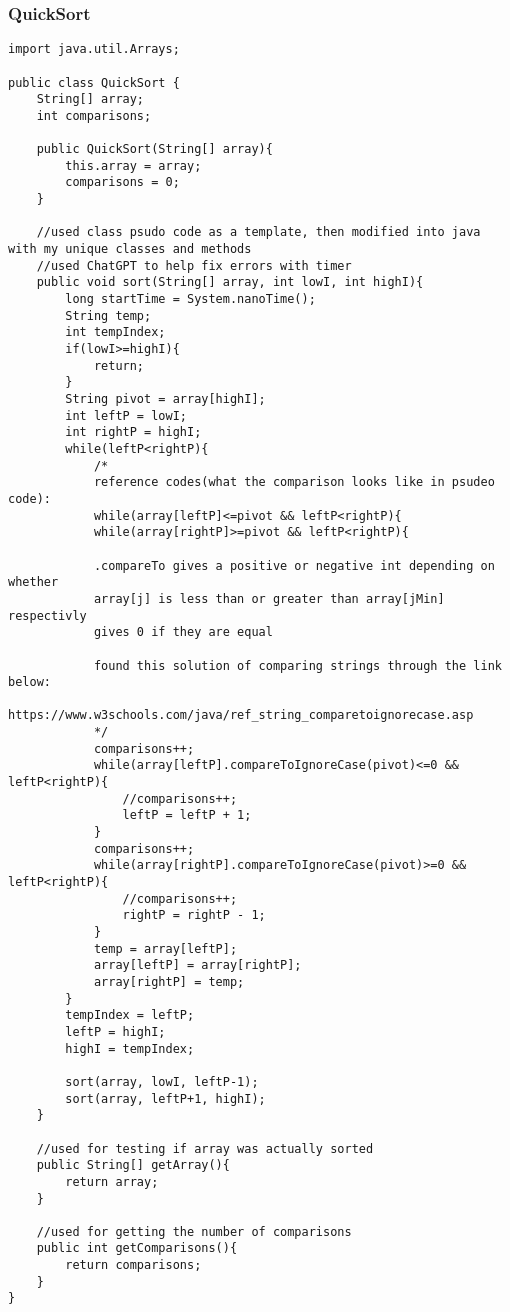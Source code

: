\documentclass[10pt]{article}
\begin{document}
\subsubsection{QuickSort}
\lstset{numbers=left, numberstyle=\tiny, stepnumber=1, numbersep=5pt, basicstyle=\footnotesize\ttfamily}
\begin{lstlisting}[frame=single, ]  
import java.util.Arrays;

public class QuickSort {
    String[] array;
    int comparisons;

    public QuickSort(String[] array){
        this.array = array;
        comparisons = 0;
    }

    //used class psudo code as a template, then modified into java with my unique classes and methods
    //used ChatGPT to help fix errors with timer
    public void sort(String[] array, int lowI, int highI){
        long startTime = System.nanoTime();
        String temp;
        int tempIndex;
        if(lowI>=highI){
            return;
        }
        String pivot = array[highI];
        int leftP = lowI;
        int rightP = highI;
        while(leftP<rightP){
            /*
            reference codes(what the comparison looks like in psudeo code):
            while(array[leftP]<=pivot && leftP<rightP){
            while(array[rightP]>=pivot && leftP<rightP){

            .compareTo gives a positive or negative int depending on whether
            array[j] is less than or greater than array[jMin] respectivly
            gives 0 if they are equal

            found this solution of comparing strings through the link below:
            https://www.w3schools.com/java/ref_string_comparetoignorecase.asp
            */
            comparisons++;
            while(array[leftP].compareToIgnoreCase(pivot)<=0 && leftP<rightP){
                //comparisons++;
                leftP = leftP + 1;
            }
            comparisons++;
            while(array[rightP].compareToIgnoreCase(pivot)>=0 && leftP<rightP){
                //comparisons++;
                rightP = rightP - 1;
            }
            temp = array[leftP];
            array[leftP] = array[rightP];
            array[rightP] = temp;
        }
        tempIndex = leftP;
        leftP = highI;
        highI = tempIndex;

        sort(array, lowI, leftP-1);
        sort(array, leftP+1, highI);
    }

    //used for testing if array was actually sorted
    public String[] getArray(){
        return array;
    }

    //used for getting the number of comparisons
    public int getComparisons(){
        return comparisons;
    }
}
\end{lstlisting}
\end{document}
